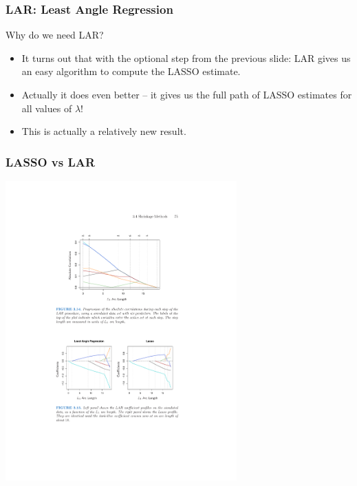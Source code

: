 \documentclass[xcolor=pdftex,dvipsnames,table,mathserif,aspectratio=169]{beamer}
\begin{document}
\begin{frame}
\frametitle{LAR: Least Angle Regression}
Why do we need LAR?
\begin{itemize}
\item It turns out that with the optional step from the previous slide: LAR gives us an easy algorithm to compute the LASSO estimate.
\item Actually it does even better -- it gives us the full path of LASSO estimates for all values of $\lambda$!
\item This is actually a relatively new result.
\end{itemize}
\end{frame}


\begin{frame}
\frametitle{LASSO vs LAR}
\begin{center}
\includegraphics[width=3.5in]{./resources/lar-lasso}
\end{center}
\end{frame}
\end{document}
